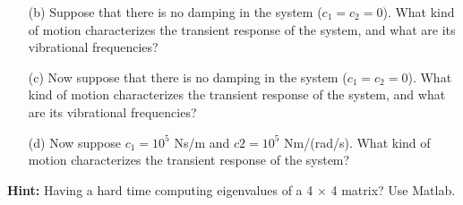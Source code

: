 \documentclass[12pt,letterpaper]{hmcpset}
\begin{document}
	\begin{problem}[1 (cont.)]
		\begin{enumerate}
		\item[(b)]  Suppose that there is no damping in the system ($c_1 = c_2 = 0$). What kind of motion
		characterizes the transient response of the system, and what are its vibrational frequencies?
		
		\item[(c)] Now suppose that there is no damping in the system ($c_1 = c_2 = 0$). What kind of motion
		characterizes the transient response of the system, and what are its vibrational frequencies?
		
		\item[(d)] Now suppose $c_1 = 10^5$ Ns/m and $c2 = 10^5$ Nm/(rad/s). What kind of motion characterizes
		the transient response of the system?
		\end{enumerate}
	\textbf{Hint:} Having a hard time computing eigenvalues of a 4 × 4 matrix? Use Matlab.

	\end{problem}
	
	
	\afterpage{\null\newpage}
	
\end{document}
